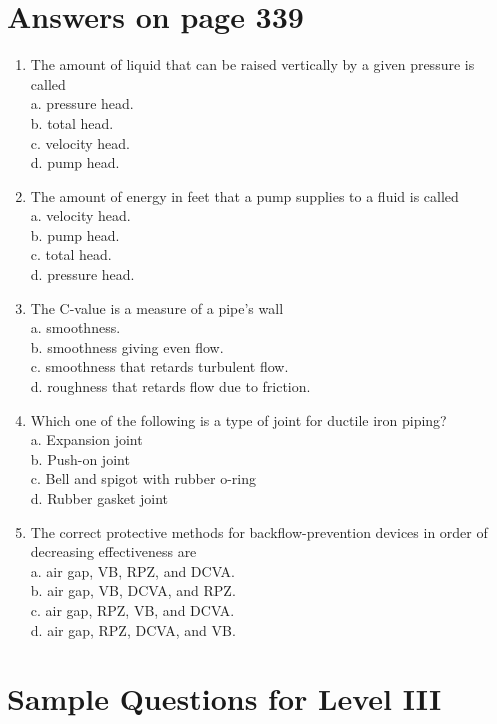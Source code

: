 \documentclass[10pt]{article}
\begin{document}
\section{Answers on page 339}
\begin{enumerate}
  \item The amount of liquid that can be raised vertically by a given pressure is called\\
a. pressure head.\\
b. total head.\\
c. velocity head.\\
d. pump head.

  \item The amount of energy in feet that a pump supplies to a fluid is called\\
a. velocity head.\\
b. pump head.\\
c. total head.\\
d. pressure head.

  \item The C-value is a measure of a pipe's wall\\
a. smoothness.\\
b. smoothness giving even flow.\\
c. smoothness that retards turbulent flow.\\
d. roughness that retards flow due to friction.

  \item Which one of the following is a type of joint for ductile iron piping?\\
a. Expansion joint\\
b. Push-on joint\\
c. Bell and spigot with rubber o-ring\\
d. Rubber gasket joint

  \item The correct protective methods for backflow-prevention devices in order of decreasing effectiveness are\\
a. air gap, VB, RPZ, and DCVA.\\
b. air gap, VB, DCVA, and RPZ.\\
c. air gap, RPZ, VB, and DCVA.\\
d. air gap, RPZ, DCVA, and VB.

\end{enumerate}

\section{Sample Questions for Level III}
\end{document}
